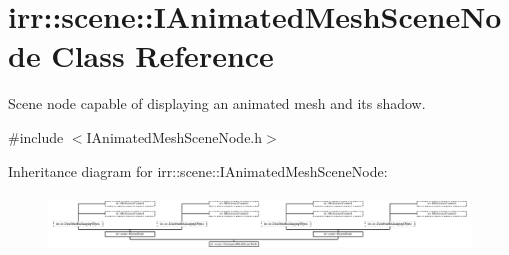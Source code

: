 \hypertarget{classirr_1_1scene_1_1IAnimatedMeshSceneNode}{}\section{irr\+:\+:scene\+:\+:I\+Animated\+Mesh\+Scene\+Node Class Reference}
\label{classirr_1_1scene_1_1IAnimatedMeshSceneNode}


Scene node capable of displaying an animated mesh and its shadow.  




{\ttfamily \#include $<$I\+Animated\+Mesh\+Scene\+Node.\+h$>$}

Inheritance diagram for irr\+:\+:scene\+:\+:I\+Animated\+Mesh\+Scene\+Node\+:\begin{figure}[H]
\begin{center}
\leavevmode
\includegraphics[height=1.515152cm]{classirr_1_1scene_1_1IAnimatedMeshSceneNode}
\end{center}
\end{figure}
